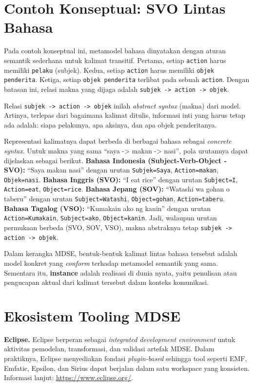 \section{Contoh Konseptual: SVO Lintas Bahasa}

Pada contoh konseptual ini, metamodel bahasa dinyatakan dengan aturan semantik sederhana untuk kalimat transitif. Pertama, setiap \texttt{action} harus memiliki \texttt{pelaku} (subjek). Kedua, setiap \texttt{action} harus memiliki \texttt{objek penderita}. Ketiga, setiap \texttt{objek penderita} terlibat pada sebuah \texttt{action}. Dengan batasan ini, relasi makna yang dijaga adalah \texttt{subjek -> action -> objek}.

Relasi \texttt{subjek -> action -> objek} inilah \textit{abstract syntax} (makna) dari model. Artinya, terlepas dari bagaimana kalimat ditulis, informasi inti yang harus tetap ada adalah: siapa pelakunya, apa aksinya, dan apa objek penderitanya.

Representasi kalimatnya dapat berbeda di berbagai bahasa sebagai \textit{concrete syntax}. Untuk makna yang sama ``saya -> makan -> nasi'', pola urutannya dapat dijelaskan sebagai berikut. \textbf{Bahasa Indonesia (Subject-Verb-Object - SVO):} ``Saya makan nasi'' dengan urutan \texttt{Subjek=Saya}, \texttt{Action=makan}, \texttt{Objek=nasi}. \textbf{Bahasa Inggris (SVO):} ``I eat rice'' dengan urutan \texttt{Subject=I}, \texttt{Action=eat}, \texttt{Object=rice}. \textbf{Bahasa Jepang (SOV):} ``Watashi wa gohan o taberu'' dengan urutan \texttt{Subject=Watashi}, \texttt{Object=gohan}, \texttt{Action=taberu}. \textbf{Bahasa Tagalog (VSO):} ``Kumakain ako ng kanin'' dengan urutan \texttt{Action=Kumakain}, \texttt{Subject=ako}, \texttt{Object=kanin}. Jadi, walaupun urutan permukaan berbeda (SVO, SOV, VSO), makna abstraknya tetap \texttt{subjek -> action -> objek}.

Dalam kerangka MDSE, bentuk-bentuk kalimat lintas bahasa tersebut adalah model konkret yang \textit{conform} terhadap metamodel semantik yang sama. Sementara itu, \textbf{instance} adalah realisasi di dunia nyata, yaitu penulisan atau pengucapan aktual dari kalimat tersebut dalam konteks komunikasi.

\section{Ekosistem Tooling MDSE}

\textbf{Eclipse.} Eclipse berperan sebagai \textit{integrated development environment} untuk aktivitas pemodelan, transformasi, dan validasi artefak MDSE. Dalam praktiknya, Eclipse menyediakan fondasi \textit{plugin-based} sehingga tool seperti EMF, Emfatic, Epsilon, dan Sirius dapat berjalan dalam satu workspace yang konsisten. Informasi lanjut: \url{https://www.eclipse.org/}.

